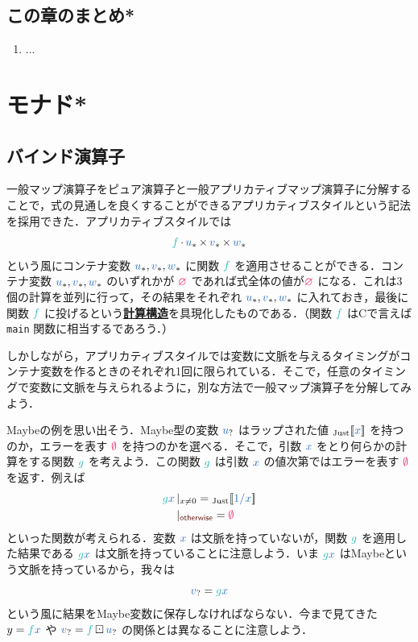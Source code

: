 \documentclass[a5paper,twoside,fleqn,draft]{jsbook}
\def\[{[\![}
\def\]{]\!]}
\def\constantColor{WildStrawberry}
\def\keywordColor{Sepia}
\def\varColor{NavyBlue}
\def\funcColor{BlueGreen}
\newcommand{\programminglanguage}[1]{\textsf{#1}}
\newcommand{\clang}{\programminglanguage{C}}
\newcommand{\keyword}[1]{{\underline{\textbf{#1}}}}
\newcommand{\code}[1]{\texttt{#1}}
\newcommand{\mKeyword}[1]{\textcolor{\keywordColor}{\mathsf{#1}}}
\newcommand{\mOtherwiseKeyword}{\mKeyword{otherwise}}
\DeclareMathOperator{\mOtherwise}{\mOtherwiseKeyword}
\newcommand{\mNothing}{\textcolor{\constantColor}{\emptyset}}
\newcommand{\mPureNothing}{\textcolor{\constantColor}{\varnothing}}
\newcommand{\mVar}[1]{\textcolor{\varColor}{#1}}
\newcommand{\mXVar}{\mVar{x}}
\newcommand{\mFunc}[1]{\textcolor{\funcColor}{#1}}
\newcommand{\mFFunc}{{\mFunc{f}}}
\newcommand{\mGFunc}{\mFunc{g}}
\DeclareMathOperator{\mAppMap}{\times}
\DeclareMathOperator{\mMap}{\cdot}
\DeclareMathOperator{\mMapMaybe}{\boxdot}
\newcommand{\mValueConstructor}[1]{\mathrm{#1}}
\newcommand{\mValueWith}[2]{{}_\mValueConstructor{#1}\[\mVar{#2}\]}
\newcommand{\mJustWith}[1]{\mValueWith{Just}{#1}}
\newcommand{\mMaybe}[1]{\mVar{#1}_?}
\newcommand{\mVarContainer}[1]{\mVar{#1}_*}
\newcommand{\mGuard}[1]{\mathop{\mid_{#1}}}
\begin{document}
\section{この章のまとめ*}

\begin{enumerate}
\item ...
\end{enumerate}

\chapter{モナド*}
\label{ch:monad}

\section{バインド演算子}

一般マップ演算子をピュア演算子と一般アプリカティブマップ演算子に分解することで，式の見通しを良くすることができるアプリカティブスタイルという記法を採用できた．アプリカティブスタイルでは
\begin{equation}
  \mFFunc\mMap\mVarContainer{u}\mAppMap\mVarContainer{v}\mAppMap\mVarContainer{w}
\end{equation}
という風にコンテナ変数 $\mVarContainer{u},\mVarContainer{v},\mVarContainer{w}$ に関数 $\mFFunc$ を適用させることができる．コンテナ変数 $\mVarContainer{u},\mVarContainer{v},\mVarContainer{w}$ のいずれかが $\mPureNothing$ であれば式全体の値が$\mPureNothing$ になる．これは3個の計算を並列に行って，その結果をそれぞれ $\mVarContainer{u},\mVarContainer{v},\mVarContainer{w}$ に入れておき，最後に関数 $\mFFunc$ に投げるという\keyword{計算構造}を具現化したものである．（関数 $\mFFunc$ は\clang で言えば \code{main} 関数に相当するであろう．）

しかしながら，アプリカティブスタイルでは変数に文脈を与えるタイミングがコンテナ変数を作るときのそれぞれ1回に限られている．そこで，任意のタイミングで変数に文脈を与えられるように，別な方法で一般マップ演算子を分解してみよう．

Maybeの例を思い出そう．Maybe型の変数 $\mMaybe{u}$ はラップされた値 $\mJustWith{x}$ を持つのか，エラーを表す $\mNothing$ を持つのかを選べる．そこで，引数 $\mXVar$ をとり何らかの計算をする関数 $\mGFunc$ を考えよう．この関数 $\mGFunc$ は引数 $\mXVar$ の値次第ではエラーを表す $\mNothing$ を返す．例えば
\begin{equation}
  \begin{aligned}
    \mGFunc\mXVar&\mGuard{x\neq0}=\mJustWith{1/x}\\
    &\mGuard{\mOtherwise}=\mNothing
  \end{aligned}
\end{equation}
といった関数が考えられる．変数 $\mXVar$ は文脈を持っていないが，関数 $\mGFunc$ を適用した結果である $\mGFunc\mXVar$ は文脈を持っていることに注意しよう．いま $\mGFunc\mXVar$ はMaybeという文脈を持っているから，我々は
\begin{equation}
\mMaybe{v}=\mGFunc\mXVar
\end{equation}
という風に結果をMaybe変数に保存しなければならない．今まで見てきた $y=\mFFunc\mXVar$ や $\mMaybe{v}=\mFFunc\mMapMaybe\mMaybe{u}$ の関係とは異なることに注意しよう．
\end{document}
